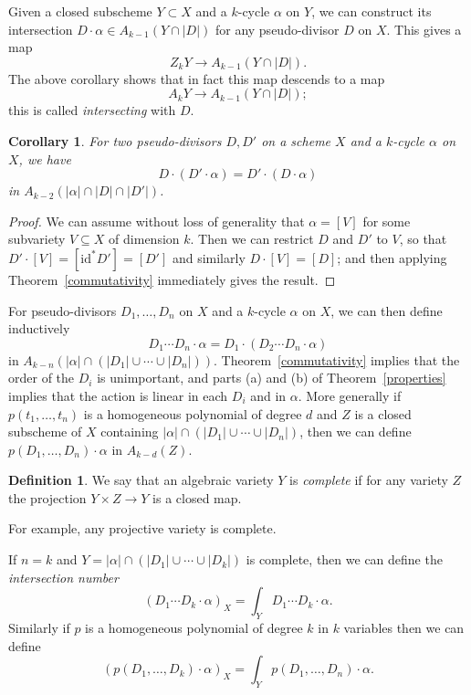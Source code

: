 \documentclass[leqno, openany]{memoir}
\newtheorem{cor}[thm]{Corollary}
\theoremstyle{definition}
\newtheorem{defn}[thm]{Definition}
\theoremstyle{remark}
\theoremstyle{plain}
\theoremstyle{definition}
\theoremstyle{remark}
\newcommand{\mr}[1]{\mathrm{#1}}
\begin{document}
Given a closed subscheme $Y \subset X$ and a $k$-cycle $\alpha$ on $Y$, we can
construct its intersection $D \cdot \alpha \in A_{k-1}(Y \cap |D|)$ for any
pseudo-divisor $D$ on $X$. This gives a map \[ Z_k Y \to A_{k-1}(Y \cap |D|) .
    \] The above corollary shows that in fact this map descends to a map \[ A_k
Y \to A_{k-1} (Y \cap |D|) ; \] this is called \textit{intersecting}  with $D$.

\begin{cor} For two pseudo-divisors $D, D'$ on a scheme $X$ and a $k$-cycle
    $\alpha$ on $X$, we have \[ D \cdot (D' \cdot \alpha) = D' \cdot (D \cdot
        \alpha) \] in $A_{k-2}(|\alpha| \cap |D| \cap |D'|)$.  \end{cor}
        \begin{proof} We can assume without loss of generality that $\alpha =
            [V]$ for some subvariety $V \subseteq X$ of dimension $k$. Then we
            can restrict $D$ and $D'$ to $V$, so that $D' \cdot [V] =
            [\mr{id}^* D'] = [D']$ and similarly $D \cdot [V] = [D]$; and then
            applying Theorem~\ref{commutativity} immediately gives the result.
        \end{proof}

For pseudo-divisors $D_1, \ldots, D_n$ on $X$ and a $k$-cycle $\alpha$ on $X$,
we can then define inductively \[ D_1 \cdots D_n \cdot \alpha = D_1 \cdot (D_2
\cdots D_n \cdot \alpha) \] in $A_{k-n} (|\alpha| \cap (|D_1| \cup \cdots \cup
|D_n|))$. Theorem~\ref{commutativity} implies that the order of the $D_i$ is
unimportant, and parts (a) and (b) of Theorem~\ref{properties} implies that the
action is linear in each $D_i$ and in $\alpha$. More generally if $p(t_1,
\ldots, t_n)$ is a homogeneous polynomial of degree $d$ and $Z$ is a closed
subscheme of $X$ containing $|\alpha| \cap (|D_1| \cup \cdots \cup |D_n|)$,
then we can define $p(D_1, \ldots, D_n) \cdot \alpha$ in $A_{k-d}(Z)$.

\begin{defn} We say that an algebraic variety $Y$ is \textit{complete}  if for
any variety $Z$ the projection $Y \times Z \to Y$ is a closed map.  \end{defn}
For example, any projective variety is complete.

If $n = k$ and $Y = |\alpha| \cap (|D_1| \cup \cdots \cup |D_k|)$ is complete,
then we can define the \textit{intersection number} \[ (D_1 \cdots D_k \cdot
    \alpha)_X = \int_Y D_1 \cdots D_k \cdot \alpha . \] Similarly if $p$ is a
    homogeneous polynomial of degree $k$ in $k$ variables then we can define \[
    (p(D_1, \ldots, D_k) \cdot \alpha)_X = \int_Y p(D_1, \ldots, D_n) \cdot
\alpha . \]
\end{document}
